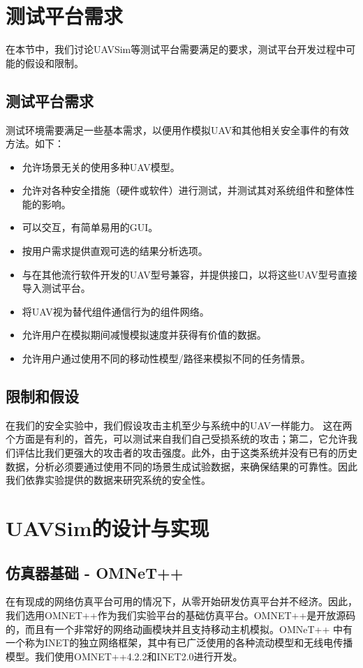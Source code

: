 \documentclass[bachelor,fontset=fandol,AutoFakeBold=true]{nuaathesis}
\begin{document}
\chapter{测试平台需求}
在本节中，我们讨论UAVSim等测试平台需要满足的要求，测试平台开发过程中可能的假设和限制。
    \section{测试平台需求}
    测试环境需要满足一些基本需求，以便用作模拟UAV和其他相关安全事件的有效方法。如下：
    \begin{itemize}
        \item 允许场景无关的使用多种UAV模型。
        \item 允许对各种安全措施（硬件或软件）进行测试，并测试其对系统组件和整体性能的影响。
        \item 可以交互，有简单易用的GUI。
        \item 按用户需求提供直观可选的结果分析选项。
        \item 与在其他流行软件开发的UAV型号兼容，并提供接口，以将这些UAV型号直接导入测试平台。
        \item 将UAV视为替代组件通信行为的组件网络。
        \item 允许用户在模拟期间减慢模拟速度并获得有价值的数据。
        \item 允许用户通过使用不同的移动性模型/路径来模拟不同的任务情景。
    \end{itemize}
    
    \section{限制和假设}
    在我们的安全实验中，我们假设攻击主机至少与系统中的UAV一样能力。 这在两个方面是有利的，首先，可以测试来自我们自己受损系统的攻击；第二，它允许我们评估比我们更强大的攻击者的攻击强度。此外，由于这类系统并没有已有的历史数据，分析必须要通过使用不同的场景生成试验数据，来确保结果的可靠性。因此我们依靠实验提供的数据来研究系统的安全性。
    
\chapter{UAVSim的设计与实现}
    \section{仿真器基础 - OMNeT++}
    在有现成的网络仿真平台可用的情况下，从零开始研发仿真平台并不经济。因此，我们选用OMNET++作为我们实验平台的基础仿真平台。OMNET++是开放源码的，而且有一个非常好的网络动画模块并且支持移动主机模拟\cite{20omnet}。OMNeT++ 中有一个称为INET的独立网络框架，其中有已广泛使用的各种流动模型和无线电传播模型\cite{21inet}。我们使用OMNET++4.2.2和INET2.0进行开发。
\end{document}
